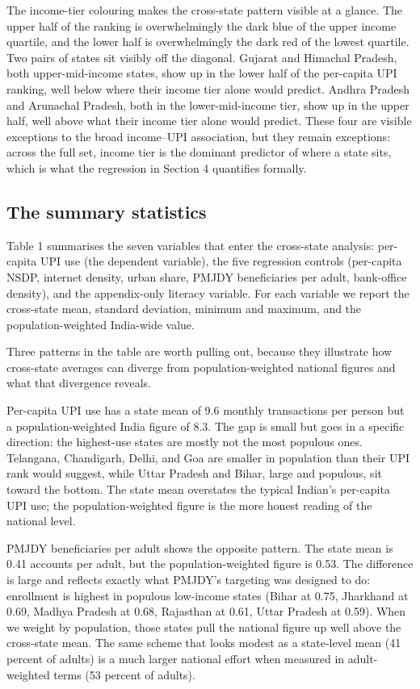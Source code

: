 \documentclass[
]{article}
\begin{document}
The income-tier colouring makes the cross-state pattern visible at a
glance. The upper half of the ranking is overwhelmingly the dark blue of
the upper income quartile, and the lower half is overwhelmingly the dark
red of the lowest quartile. Two pairs of states sit visibly off the
diagonal. Gujarat and Himachal Pradesh, both upper-mid-income states,
show up in the lower half of the per-capita UPI ranking, well below
where their income tier alone would predict. Andhra Pradesh and
Arunachal Pradesh, both in the lower-mid-income tier, show up in the
upper half, well above what their income tier alone would predict. These
four are visible exceptions to the broad income--UPI association, but
they remain exceptions: across the full set, income tier is the dominant
predictor of where a state sits, which is what the regression in Section
4 quantifies formally.

\subsection{The summary statistics}\label{the-summary-statistics}

Table 1 summarises the seven variables that enter the cross-state
analysis: per-capita UPI use (the dependent variable), the five
regression controls (per-capita NSDP, internet density, urban share,
PMJDY beneficiaries per adult, bank-office density), and the
appendix-only literacy variable. For each variable we report the
cross-state mean, standard deviation, minimum and maximum, and the
population-weighted India-wide value.

Three patterns in the table are worth pulling out, because they
illustrate how cross-state averages can diverge from population-weighted
national figures and what that divergence reveals.

Per-capita UPI use has a state mean of 9.6 monthly transactions per
person but a population-weighted India figure of 8.3. The gap is small
but goes in a specific direction: the highest-use states are mostly not
the most populous ones. Telangana, Chandigarh, Delhi, and Goa are
smaller in population than their UPI rank would suggest, while Uttar
Pradesh and Bihar, large and populous, sit toward the bottom. The state
mean overstates the typical Indian's per-capita UPI use; the
population-weighted figure is the more honest reading of the national
level.

PMJDY beneficiaries per adult shows the opposite pattern. The state mean
is 0.41 accounts per adult, but the population-weighted figure is 0.53.
The difference is large and reflects exactly what PMJDY's targeting was
designed to do: enrollment is highest in populous low-income states
(Bihar at 0.75, Jharkhand at 0.69, Madhya Pradesh at 0.68, Rajasthan at
0.61, Uttar Pradesh at 0.59). When we weight by population, those states
pull the national figure up well above the cross-state mean. The same
scheme that looks modest as a state-level mean (41 percent of adults) is
a much larger national effort when measured in adult-weighted terms (53
percent of adults).
\end{document}
